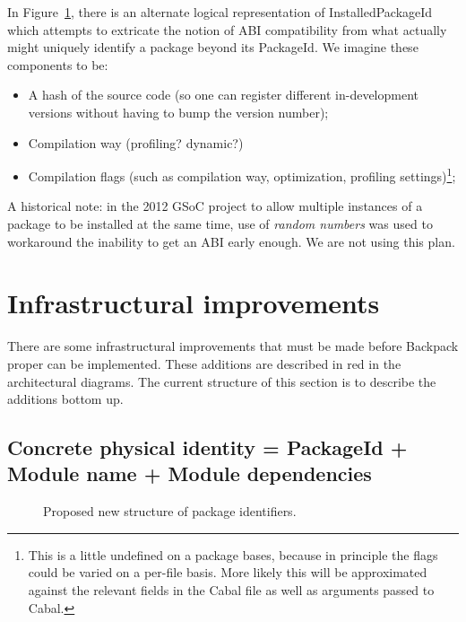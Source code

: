 \documentclass{article}
\begin{document}
In Figure~\ref{fig:proposed-pkgid}, there is an alternate logical
representation of InstalledPackageId which attempts to extricate the
notion of ABI compatibility from what actually might uniquely identify a
package beyond its PackageId.  We imagine these components to be:

\begin{itemize}
    \item A hash of the source code (so one can register different
        in-development versions without having to bump the version
        number);
    \item Compilation way (profiling? dynamic?)
    \item Compilation flags (such as compilation way, optimization,
        profiling settings)\footnote{This is a little undefined on a package bases, because in principle the flags could be varied on a per-file basis. More likely this will be approximated against the relevant fields in the Cabal file as well as arguments passed to Cabal.};
\end{itemize}

A historical note: in the 2012 GSoC project to allow multiple instances
of a package to be installed at the same time, use of \emph{random
numbers} was used to workaround the inability to get an ABI early
enough.  We are not using this plan.

\section{Infrastructural improvements}

There are some infrastructural improvements that must be made before
Backpack proper can be implemented.  These additions are described in
red in the architectural diagrams.  The current structure of this
section is to describe the additions bottom up.

\subsection{Concrete physical identity = PackageId + Module name + Module dependencies}\label{sec:ipi}

\begin{figure}
\label{fig:proposed-pkgid}\caption{Proposed new structure of package identifiers.}
\end{figure}
\end{document}
